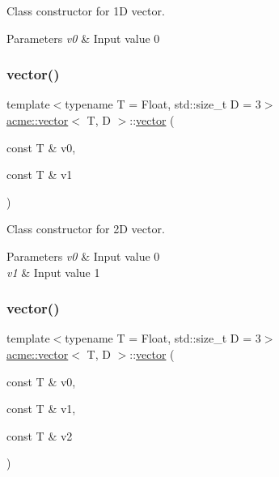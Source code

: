 Class constructor for 1D vector. 


\begin{DoxyParams}{Parameters}
{\em v0} & Input value 0 \\
\hline
\end{DoxyParams}
\mbox{\label{classacme_1_1vector_a8ff8e02ac02848f92e7c8d04e6e24e85}} 
\subsubsection{\texorpdfstring{vector()}{vector()}\hspace{0.1cm}{\footnotesize\ttfamily [2/5]}}
{\footnotesize\ttfamily template$<$typename T = Float, std\+::size\+\_\+t D = 3$>$ \\
\hyperlink{classacme_1_1vector}{acme\+::vector}$<$ T, D $>$\+::\hyperlink{classacme_1_1vector}{vector} (\begin{DoxyParamCaption}\item[{const T \&}]{v0,  }\item[{const T \&}]{v1 }\end{DoxyParamCaption})\hspace{0.3cm}{\ttfamily [inline]}}



Class constructor for 2D vector. 


\begin{DoxyParams}{Parameters}
{\em v0} & Input value 0 \\
\hline
{\em v1} & Input value 1 \\
\hline
\end{DoxyParams}
\mbox{\label{classacme_1_1vector_ae5a62d7c7bb2c843014935db07c65e63}} 
\subsubsection{\texorpdfstring{vector()}{vector()}\hspace{0.1cm}{\footnotesize\ttfamily [3/5]}}
{\footnotesize\ttfamily template$<$typename T = Float, std\+::size\+\_\+t D = 3$>$ \\
\hyperlink{classacme_1_1vector}{acme\+::vector}$<$ T, D $>$\+::\hyperlink{classacme_1_1vector}{vector} (\begin{DoxyParamCaption}\item[{const T \&}]{v0,  }\item[{const T \&}]{v1,  }\item[{const T \&}]{v2 }\end{DoxyParamCaption})\hspace{0.3cm}{\ttfamily [inline]}}



